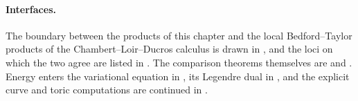 \paragraph{Interfaces.}
The boundary between the products of this chapter and the local
Bedford--Taylor products of the Chambert--Loir--Ducros calculus is drawn in
, and the loci on
which the two agree are listed in .  The comparison
theorems themselves are  and
.  Energy enters the variational equation in
, its Legendre dual in
, and the explicit curve and toric
computations are continued in .
